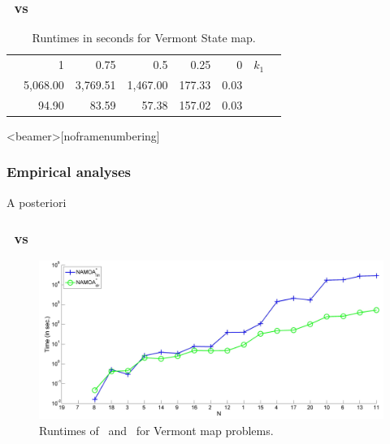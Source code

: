 \begin{frame} 
\frametitle{\lexgodr \ vs \lexgo}
	\begin{table}
	\caption{Runtimes in seconds for Vermont State map.}
	\vspace{2mm}
	\centering
	\begin{tabular}{rrrrrrrr}
	\hline \noalign{\smallskip}
 	& 1 & 0.75 & 0.5 & 0.25 & 0 & \multicolumn{1}{c}{$k_1$}\\
	\noalign{\smallskip} 
	\cline{2-6} \noalign{\smallskip} 
	\lexgolex & 5,068.00 & 3,769.51 & 1,467.00 & 177.33 & 0.03 \\
	\textcolor{red}{\lexgodr} & \textcolor{ao}{94.90} &	\textcolor{ao}{83.59} & \textcolor{ao}{57.38} & \textcolor{ao}{157.02} & \textcolor{ao}{0.03} \\
	\hline
	\end{tabular}
	\end{table}
\end{frame}
\begin{frame}<beamer>[noframenumbering]
\frametitle{Empirical analyses}
	\begin{center}
		\LARGE{\textcolor{ao}{A posteriori}}
	\end{center}
	\begin{table}
	\centering
	\end{table}
\note{}
\end{frame}
\begin{frame} 
\frametitle{\namoadr \ vs \namoa}
	\begin{figure}
    	\centering
		\includegraphics[scale=0.1]{figs/namoadr-roads-exe}
	\caption{Runtimes of \namoalin \ and \namoadr \ for Vermont map problems.}
	\end{figure}
\end{frame}
